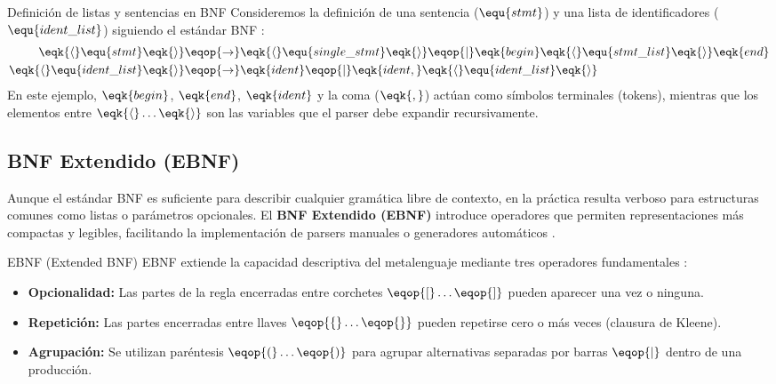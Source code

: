 \begin{ejemplo}{Definición de listas y sentencias en BNF}
Consideremos la definición de una sentencia ($\equ{stmt}$) y una lista de identificadores ($\equ{ident\_list}$) siguiendo el estándar BNF \cite{aho2006compilers}:
\begin{align*}
\eqk{\langle} \equ{stmt} \eqk{\rangle} &\eqop{\rightarrow} \eqk{\langle} \equ{single\_stmt} \eqk{\rangle} \eqop{\mid} \eqk{begin} \eqk{\langle} \equ{stmt\_list} \eqk{\rangle} \eqk{end} \\
\eqk{\langle} \equ{ident\_list} \eqk{\rangle} &\eqop{\rightarrow} \eqk{ident} \eqop{\mid} \eqk{ident, } \eqk{\langle} \equ{ident\_list} \eqk{\rangle}
\end{align*}
En este ejemplo, $\eqk{begin}$, $\eqk{end}$, $\eqk{ident}$ y la coma ($\eqk{,}$) actúan como símbolos terminales (tokens), mientras que los elementos entre $\eqk{\langle} \dots \eqk{\rangle}$ son las variables que el parser debe expandir recursivamente.
\end{ejemplo}

\subsection{BNF Extendido (EBNF)}
\label{subsec:3_3_2_ebnf}

Aunque el estándar BNF es suficiente para describir cualquier gramática libre de contexto, en la práctica resulta verboso para estructuras comunes como listas o parámetros opcionales. El \textbf{BNF Extendido (EBNF)} introduce operadores que permiten representaciones más compactas y legibles, facilitando la implementación de parsers manuales o generadores automáticos \cite{aho2006compilers}.

\begin{definicion}{EBNF (Extended BNF)}
EBNF extiende la capacidad descriptiva del metalenguaje mediante tres operadores fundamentales \cite{aho2006compilers,sipser2012introduction}:
\begin{itemize}
    \item \textbf{Opcionalidad:} Las partes de la regla encerradas entre corchetes $\eqop{[} \dots \eqop{]}$ pueden aparecer una vez o ninguna.
    \item \textbf{Repetición:} Las partes encerradas entre llaves $\eqop{\{} \dots \eqop{\}}$ pueden repetirse cero o más veces (clausura de Kleene).
    \item \textbf{Agrupación:} Se utilizan paréntesis $\eqop{(} \dots \eqop{)}$ para agrupar alternativas separadas por barras $\eqop{\mid}$ dentro de una producción.
\end{itemize}
\end{definicion}

